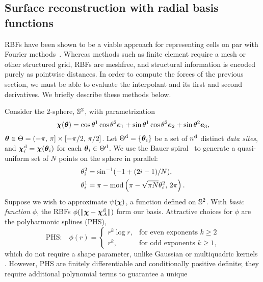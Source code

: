 \subsection{Surface reconstruction with radial basis functions}

RBFs have been shown to be a viable approach for representing cells on par with Fourier
methods~\cite{Shankar:2013ki}. Whereas methods such as finite element require a mesh or
other structured grid, RBFs are meshfree, and structural information is encoded purely as
pointwise distances. In order to compute the forces of the previous section, we must be
able to evaluate the interpolant and its first and second derivatives. We briefly
describe these methods below.

Consider the 2-sphere, $\mathbb{S}^2$, with parametrization
\begin{equation*}
    \Xp(\qs) = \cos\q[1]\cos\q[2]\e_1 + \sin\q[1]\cos\q[2]\e_2 + \sin\q[2]\e_3,
\end{equation*}
$\boldsymbol{\theta}\in\Theta = (-\pi,\,\pi]\times[-\pi/2,\,\pi/2]$. Let ${\Theta}^\text{d} = \{\boldsymbol{\theta}_i\}$ be a
set of ${n}^\text{d}$ distinct \emph{data sites}, and ${\boldsymbol{\chi}}^\text{d}_i = \boldsymbol{\chi}(\boldsymbol{\theta}_i)$ for
each $\boldsymbol{\theta}_i \in {\ensuremath{\Theta}}^\text{d}$. We use the Bauer spiral~\cite{Bauer:2000km} to generate a
quasi-uniform set of $N$ points on the sphere in parallel:
\begin{equation}
    \begin{aligned}
        \q[2]_i &= \sin^{-1}(-1 + (2 i - 1) / N), \\
        \q[1]_i &= \pi - \modulo\left(\pi - \sqrt{\pi N} \q[2]_i,\,2\pi\right).
    \end{aligned}
    \label{eq:bauer-spiral}
\end{equation}
Suppose we wish to approximate $\psi(\boldsymbol{\chi})$, a function defined on $\mathbb{S}^2$. With
\emph{basic function} $\phi$, the RBFs $\phi(\|\boldsymbol{\chi}-{\boldsymbol{\chi}}^\text{d}_A\|)$ form our basis.
Attractive choices for $\phi$ are the polyharmonic splines (PHS),
\begin{equation*}
    \text{PHS:}\quad\phi(r) = \begin{cases}
        r^k \log r, & \text{for even exponents } k \ge 2 \\
        r^k, & \text{for odd exponents } k \ge 1,
    \end{cases}
\end{equation*}
which do not require a shape parameter, unlike Gaussian or multiquadric kernels~%
\cite{Fasshauer:2007ui}. However, PHS are finitely differentiable and conditionally
positive definite; they require additional polynomial terms to guarantee a unique
